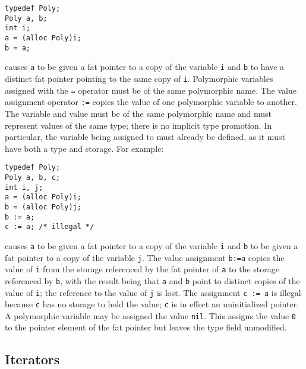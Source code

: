 \begin{lstlisting}
typedef Poly;
Poly a, b;
int i;
a = (alloc Poly)i;
b = a; 
\end{lstlisting}

causes \passthrough{\lstinline!a!} to be given a fat pointer to a copy
of the variable \passthrough{\lstinline!i!} and
\passthrough{\lstinline!b!} to have a distinct fat pointer pointing to
the same copy of \passthrough{\lstinline!i!}. Polymorphic variables
assigned with the \passthrough{\lstinline!=!} operator must be of the
same polymorphic name. The value assignment operator
\passthrough{\lstinline!:=!} copies the value of one polymorphic
variable to another. The variable and value must be of the same
polymorphic name and must represent values of the same type; there is no
implicit type promotion. In particular, the variable being assigned to
must already be defined, as it must have both a type and storage. For
example:

\begin{lstlisting}
typedef Poly;
Poly a, b, c;
int i, j;
a = (alloc Poly)i;
b = (alloc Poly)j;
b := a; 
c := a; /* illegal */
\end{lstlisting}

causes \passthrough{\lstinline!a!} to be given a fat pointer to a copy
of the variable \passthrough{\lstinline!i!} and
\passthrough{\lstinline!b!} to be given a fat pointer to a copy of the
variable \passthrough{\lstinline!j!}. The value assignment
\passthrough{\lstinline!b:=a!} copies the value of
\passthrough{\lstinline!i!} from the storage referenced by the fat
pointer of \passthrough{\lstinline!a!} to the storage referenced by
\passthrough{\lstinline!b!}, with the result being that
\passthrough{\lstinline!a!} and \passthrough{\lstinline!b!} point to
distinct copies of the value of \passthrough{\lstinline!i!}; the
reference to the value of \passthrough{\lstinline!j!} is lost. The
assignment \passthrough{\lstinline!c := a!} is illegal because
\passthrough{\lstinline!c!} has no storage to hold the value;
\passthrough{\lstinline!c!} is in effect an uninitialized pointer. A
polymorphic variable may be assigned the value
\passthrough{\lstinline!nil!}. This assigns the value
\passthrough{\lstinline!0!} to the pointer element of the fat pointer
but leaves the type field unmodified.

\hypertarget{iterators}{%
\subsection{Iterators}\label{iterators}}

